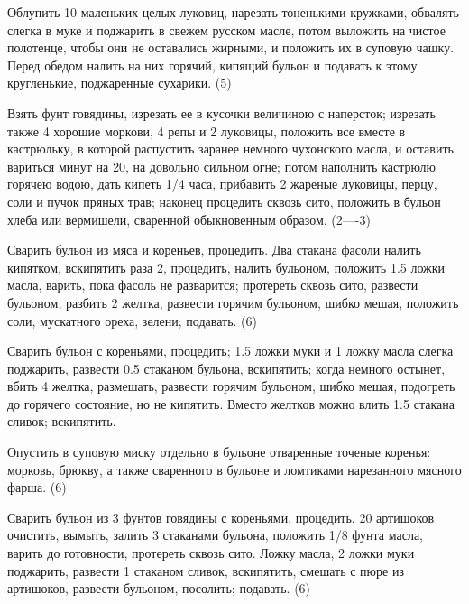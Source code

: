 
Облупить 10 маленьких целых луковиц, нарезать тоненькими кружками, обвалять слегка в муке и поджарить в свежем русском масле, потом выложить на чистое полотенце, чтобы они не оставались жирными, и положить их в суповую чашку. Перед обедом налить на них горячий, кипящий бульон и подавать к этому кругленькие, поджаренные сухарики. (5)


Взять фунт говядины, изрезать ее в кусочки величиною с наперсток; изрезать также 4 хорошие моркови, 4 репы и 2 луковицы, положить все вместе в кастрюльку, в которой распустить заранее немного чухонского масла, и оставить вариться минут на 20, на довольно сильном огне; потом наполнить кастрюлю горячею водою, дать кипеть 1/4 часа, прибавить 2 жареные луковицы, перцу, соли и пучок пряных трав; наконец процедить сквозь сито, положить в бульон хлеба или вермишели, сваренной обыкновенным образом. (2—-3)


Сварить бульон из мяса и кореньев, процедить. Два стакана фасоли налить кипятком, вскипятить раза 2, процедить, налить бульоном, положить 1.5 ложки масла, варить, пока фасоль не разварится; протереть сквозь сито, развести бульоном, разбить 2 желтка, развести горячим бульоном, шибко мешая, положить соли, мускатного ореха, зелени; подавать. (6)


Сварить бульон с кореньями, процедить; 1.5 ложки муки и 1 ложку масла слегка поджарить, развести 0.5 стаканом бульона, вскипятить; когда немного остынет, вбить 4 желтка, размешать, развести горячим бульоном, шибко мешая, подогреть до горячего состояние, но не кипятить. Вместо желтков можно влить 1.5 стакана сливок; вскипятить.

Опустить в суповую миску отдельно в бульоне отваренные точеные коренья: морковь, брюкву, а также сваренного в бульоне и ломтиками нарезанного мясного фарша. (6)


Сварить бульон из 3 фунтов говядины с кореньями, процедить. 20 артишоков очистить, вымыть, залить 3 стаканами бульона, положить 1/8 фунта масла, варить до готовности, протереть сквозь сито. Ложку масла, 2 ложки муки поджарить, развести 1 стаканом сливок, вскипятить, смешать с пюре из артишоков, развести бульоном, посолить; подавать. (6)

